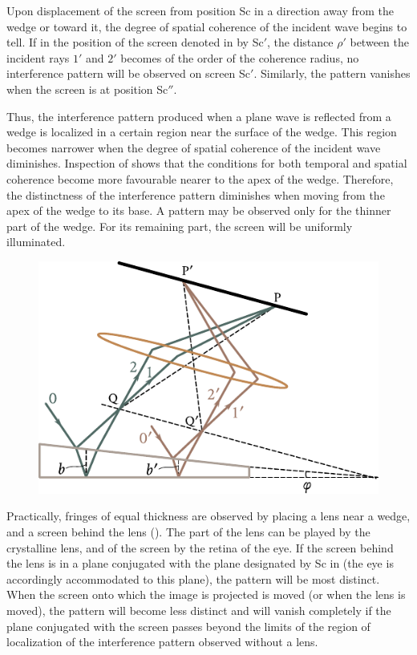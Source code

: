Upon displacement of the screen from position Sc in a direction away from the wedge or toward it, the degree of spatial coherence of the incident wave begins to tell.
If in the position of the screen denoted in  by Sc$'$, the distance $\rho'$ between the incident rays $1'$ and $2'$ becomes of the order of the coherence radius, no interference pattern will be observed on screen Sc$'$.
Similarly, the pattern vanishes when the screen is at position Sc$''$.

Thus, the interference pattern produced when a plane wave is reflected from a wedge is localized in a certain region near the surface of the wedge.
This region becomes narrower when the degree of spatial coherence of the incident wave diminishes.
Inspection of  shows that the conditions for both temporal and spatial coherence
become more favourable nearer to the apex of the wedge.
Therefore, the distinctness of the interference pattern diminishes when moving from the apex of the wedge to its base.
A pattern may be observed only for the thinner part of the wedge.
For its remaining part, the screen will be uniformly illuminated.

\begin{figure}[!htb]
	\begin{center}
		\includegraphics[scale=0.9]{figures/ch_17/fig_17_14.pdf}
		\caption[]{}
		\label{fig:17_14}
	\end{center}
	\vspace{-0.8cm}
\end{figure}

Practically, fringes of equal thickness are observed by placing a lens near a wedge, and a screen behind the lens ().
The part of the lens can be played by the crystalline lens, and of the screen by the retina of the eye.
If the screen behind the lens is in a plane conjugated with the plane designated by Sc in  (the eye is accordingly accommodated to this plane), the pattern will be most distinct.
When the screen onto which the image is projected is moved (or when the lens is moved), the pattern will become less distinct and will vanish completely if the plane conjugated with the screen passes beyond the limits of the region of localization of the interference pattern observed without a lens.

